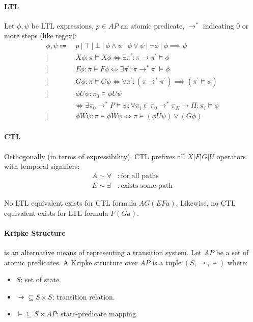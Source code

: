 \documentclass[99-notes-packed.tex]{subfiles}
\begin{document}
\paragraph*{LTL}
Let $\phi, \psi$ be LTL expressions, $p \in AP$ an atomic predicate, $\rightarrow^\ast$ indicating 0 or more steps (like regex):
\begin{align*}
    \phi, \psi \Coloneqq&\ p\ |\ \top\ |\ \bot\ |\ \phi \wedge \psi\ |\ \phi \vee \psi\ |\ \neg \phi\ |\ \phi \implies \psi \\
    |&\ X \phi: 
        \pi \models X \phi \iff 
        \exists {\pi}^{'}: \pi \rightarrow {\pi}^{'} \models \phi \\
    |&\ F \phi: 
        \pi \models F \phi \iff
        \exists {\pi}^{'}: \pi \rightarrow^\ast {\pi}^{'} \models \phi \\
    |&\ G \phi: 
        \pi \models G \phi \iff
        \forall {\pi}^{'}: (\pi \rightarrow^\ast {\pi}^{'}) \implies ({\pi}^{'} \models \phi) \\ 
    |&\ \phi U \psi: \pi_0 \models \phi U \psi \\
     &  \iff \exists \pi_0 \rightarrow^\ast P \models \psi: \forall \pi_i \in \pi_0 \rightarrow^\ast \pi_N \rightarrow \Pi: \pi_i \models \phi \\
    |&\ \phi W \psi: 
        \pi \models \phi W \psi \iff \pi \models (\phi U \psi) \vee (G \phi)
\end{align*}

\paragraph*{CTL}
Orthogonally (in terms of expressibility), CTL prefixes all $X | F | G | U$ operators with temporal signifiers: 
\begin{align*}
    A \sim \forall&:\ \textrm{for all paths} \\
    E \sim \exists&:\ \textrm{exists some path} 
\end{align*}

\begin{example}
    No LTL equivalent exists for CTL formula $AG(EF a)$. Likewise, no CTL equivalent exists for LTL formula $F(G a)$. 
\end{example}

\paragraph*{Kripke Structure} is an alternative means of representing a transition system. Let $AP$ be a set of atomic predicates. A Kripke structure over $AP$ is a tuple $(S, \rightarrowtriangle, \models)$ where: 
\begin{itemize}
    \item $S$: set of state.
    \item $\rightarrowtriangle \subseteq S \times S$: transition relation. 
    \item $\models \subseteq S \times AP$: state-predicate mapping. 
\end{itemize}
\end{document}
